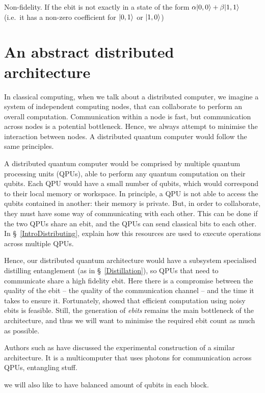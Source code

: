 Non-fidelity. If the ebit is not exactly in a state of the form \(\alpha\vert 0,0 \rangle + \beta\vert 1,1 \rangle\) (i.e.\ it has a non-zero coefficient for \(\vert 0,1 \rangle\) or \(\vert 1,0 \rangle\))

\section{An abstract distributed architecture}
\label{DQC_Architecture}

In classical computing, when we talk about a distributed computer, we imagine a system of independent computing nodes, that can collaborate to perform an overall computation. Communication within a node is fast, but communication across nodes is a potential bottleneck. Hence, we always attempt to minimise the interaction between nodes. A distributed quantum computer would follow the same principles.

A distributed quantum computer would be comprised by multiple quantum processing units (QPUs), able to perform any quantum computation on their qubits. Each QPU would have a small number of qubits, which would correspond to their local memory or workspace. In principle, a QPU is not able to access the qubits contained in another: their memory is private. But, in order to collaborate, they must have some way of communicating with each other. This can be done if the two QPUs share an ebit, and the QPUs can send classical bits to each other. In \S~\ref{IntroDistributing}, explain how this resources are used to execute operations across multiple QPUs. 

Hence, our distributed quantum architecture would have a subsystem specialised distilling entanglement (as in \S~\ref{Distillation}), so QPUs that need to communicate share a high fidelity ebit. Here there is a compromise between the quality of the ebit -- the quality of the communication channel -- and the time it takes to ensure it. Fortunately, \citet{NoisyChannels} showed that efficient computation using noisy ebits is feasible. Still, the generation of \textit{ebits} remains the main bottleneck of the architecture, and thus we will want to minimise the required ebit count as much as possible.

Authors such as \citet{DistributedQCHW} have discussed the experimental construction of a similar architecture. It is a multicomputer that uses photons for communication across QPUs, entangling stuff.

we will also like to have balanced amount of qubits in each block.

